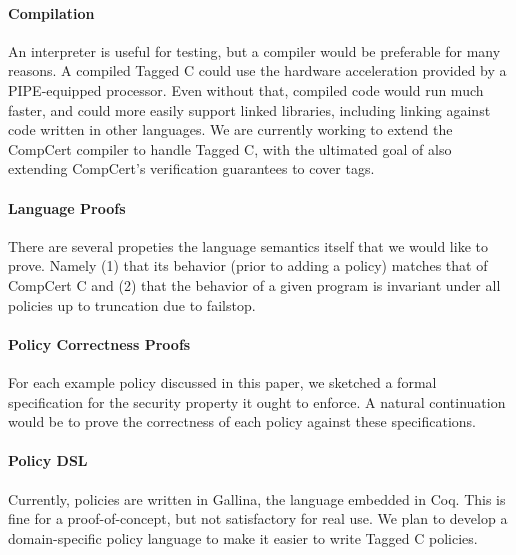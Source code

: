 \documentclass{llncs}
\begin{document}
\paragraph{Compilation}

An interpreter is useful for testing, but a compiler would be preferable for many reasons.
A compiled Tagged C could use the hardware acceleration provided by a PIPE-equipped processor.
Even without that, compiled code would run much faster, and could more easily
support linked libraries, including linking against code written in other languages.
We are currently working to extend the CompCert compiler to handle Tagged C, with the ultimated
goal of also extending CompCert's verification guarantees to cover tags.

\paragraph{Language Proofs}

There are several propeties the language semantics itself that we would like to prove.
Namely (1) that its behavior (prior to adding a policy) matches that of CompCert C and
(2) that the behavior of a given program is invariant under all policies up to truncation due
to failstop. 

\paragraph{Policy Correctness Proofs}

For each example policy discussed in this paper, we sketched a formal specification for the
security property it ought to enforce. A natural continuation would be to prove the correctness
of each policy against these specifications.

\paragraph{Policy DSL}

Currently, policies are written in Gallina, the language embedded in Coq. This is fine for a
proof-of-concept, but not satisfactory for real use. We plan to develop a domain-specific policy
language to make it easier to write Tagged C policies.



\end{document}
